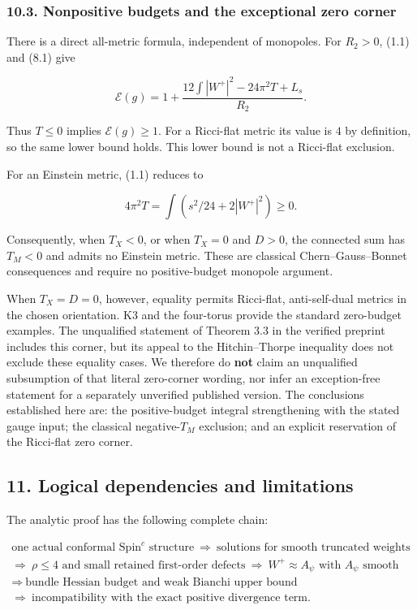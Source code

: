 \documentclass[
  10pt,
]{article}
\begin{document}
\hypertarget{nonpositive-budgets-and-the-exceptional-zero-corner}{%
\subsubsection{10.3. Nonpositive budgets and the exceptional zero
corner}\label{nonpositive-budgets-and-the-exceptional-zero-corner}}

There is a direct all-metric formula, independent of monopoles. For
\(R_2>0\), (1.1) and (8.1) give

\[
 \mathcal E(g)
   =1+\frac{12\int|W^+|^2-24\pi^2T+L_s}{R_2}.           \tag{10.5}
\]

Thus \(T\le0\) implies \(\mathcal E(g)\ge1\). For a Ricci-flat metric
its value is \(4\) by definition, so the same lower bound holds. This
lower bound is not a Ricci-flat exclusion.

For an Einstein metric, (1.1) reduces to

\[
               4\pi^2T=\int(s^2/24+2|W^+|^2)\ge0.
\]

Consequently, when \(T_X<0\), or when \(T_X=0\) and \(D>0\), the
connected sum has \(T_M<0\) and admits no Einstein metric. These are
classical Chern--Gauss--Bonnet consequences and require no
positive-budget monopole argument.

When \(T_X=D=0\), however, equality permits Ricci-flat, anti-self-dual
metrics in the chosen orientation. K3 and the four-torus provide the
standard zero-budget examples. The unqualified statement of Theorem 3.3
in the verified preprint includes this corner, but its appeal to the
Hitchin--Thorpe inequality does not exclude these equality cases. We
therefore do \textbf{not} claim an unqualified subsumption of that
literal zero-corner wording, nor infer an exception-free statement for a
separately unverified published version. The conclusions established
here are: the positive-budget integral strengthening with the stated
gauge input; the classical negative-\(T_M\) exclusion; and an explicit
reservation of the Ricci-flat zero corner.

\hypertarget{logical-dependencies-and-limitations}{%
\subsection{11. Logical dependencies and
limitations}\label{logical-dependencies-and-limitations}}

The analytic proof has the following complete chain:

\[
 \begin{gathered}
 \text{one actual conformal Spin}^c\text{ structure}
 \ \Longrightarrow\ \text{solutions for smooth truncated weights}\\
 \Longrightarrow\ \rho\le4\text{ and small retained first-order defects}
 \ \Longrightarrow\ W^+\approx A_\psi\text{ with }A_\psi\text{ smooth}\\
 \Longrightarrow\ \text{bundle Hessian budget and weak Bianchi upper bound}\\
 \Longrightarrow\ \text{incompatibility with the exact positive divergence term}.
 \end{gathered}
\]
\end{document}
